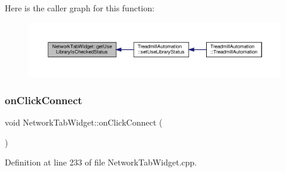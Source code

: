 Here is the caller graph for this function\+:
\nopagebreak
\begin{figure}[H]
\begin{center}
\leavevmode
\includegraphics[width=350pt]{class_network_tab_widget_a556f499076cd56a2090c007eb5f1e6be_icgraph}
\end{center}
\end{figure}
\mbox{\label{class_network_tab_widget_a852eff05d0a613eb7b8fc0e0bfdd0736}} 
\subsubsection{\texorpdfstring{on\+Click\+Connect}{onClickConnect}}
{\footnotesize\ttfamily void Network\+Tab\+Widget\+::on\+Click\+Connect (\begin{DoxyParamCaption}{ }\end{DoxyParamCaption})\hspace{0.3cm}{\ttfamily [slot]}}



Definition at line 233 of file Network\+Tab\+Widget.\+cpp.

